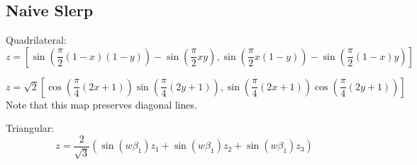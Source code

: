 \documentclass{amsart}[12pt]
\begin{document}
\subsection{Naive Slerp}

Quadrilateral:
\begin{equation}
z = \left[\sin\left(\frac{\pi}{2} (1-x)(1-y)\right)
- \sin\left(\frac{\pi}{2} x y\right),
\sin\left(\frac{\pi}{2} x (1-y)\right)
- \sin\left(\frac{\pi}{2} (1-x) y\right)\right]
\end{equation}

\begin{equation}
z = \sqrt 2 \left[\cos\left(\frac{\pi}{4} (2x+1)\right)
\sin\left(\frac{\pi}{4} (2y+1)\right),
\sin\left(\frac{\pi}{4} (2x+1)\right)
\cos\left(\frac{\pi}{4} (2y+1)\right)\right]
\end{equation}
Note that this map preserves diagonal lines.

Triangular:
\begin{equation}
z = \frac{2}{\sqrt 3} \left(\sin(w \beta_1 ) z_1 + \sin(w \beta_1 ) z_2
+ \sin(w \beta_1 ) z_3\right)
\end{equation}
\end{document}
